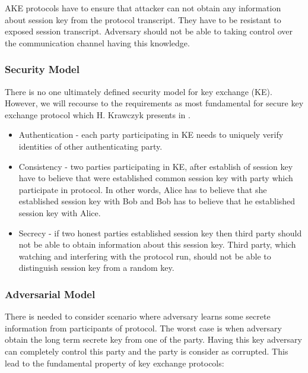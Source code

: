 \documentclass[11pt,titlepage]{article}
\theoremstyle{plain}
\begin{document}
\vspace{5mm}

AKE protocols have to ensure that attacker can not obtain any information about session key from the protocol transcript. They have to be resistant to exposed session transcript. Adversary should not be able to taking control over the communication channel having this knowledge.

\subsubsection{Security Model}
There is no one ultimately defined security model for key exchange (KE). However, we will recourse to the requirements as most fundamental for secure key exchange protocol which H. Krawczyk presents in \cite{sign_mac}.

\begin{itemize}
	\item Authentication - each party participating in KE needs to uniquely verify identities of other authenticating party.
	\item Consistency - two parties participating in KE, after establish of session key have to believe that were established common session key with party which participate in protocol. In other words, Alice has to believe that she established session key with Bob and Bob has to believe that he established session key with Alice.
	\item Secrecy - if two honest parties established session key then third party should not be able to obtain information about this session key. Third party, which watching and interfering with the protocol run, should not be able to distinguish session key from a random key.
\end{itemize}

\subsubsection{Adversarial Model}
There is needed to consider scenario where adversary learns some secrete information from participants of protocol. The worst case is when adversary obtain the long term secrete key from one of the party. Having this key adversary can completely control this party and the party is consider as corrupted. This lead to the fundamental property of key exchange protocols:
\end{document}
